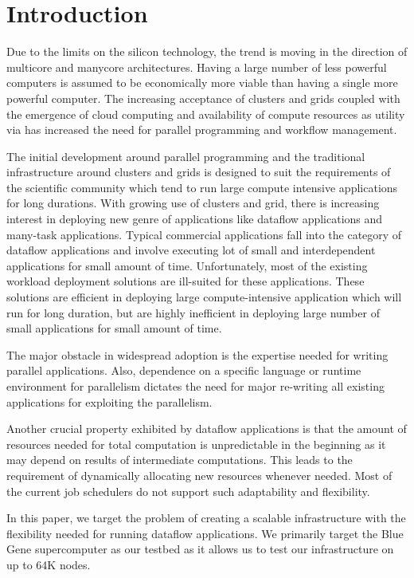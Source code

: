 \documentclass[conference]{sig-alternate}
\begin{document}
\IEEEpeerreviewmaketitle

\section{Introduction}

Due to the limits on the silicon technology, the trend is moving in the
direction of multicore and manycore architectures.  Having a large number of
less powerful computers is assumed to be economically more viable than having a
single more powerful computer.  The increasing acceptance of clusters and
grids coupled with the emergence of cloud computing and availability of compute
resources as utility via \cite{ec2} \cite{azure} \cite{appengine} has increased
the need for parallel programming and workflow management.

The initial development around parallel programming and the traditional
infrastructure around clusters and grids is designed to suit the
requirements of the scientific community which tend to run large compute
intensive applications for long durations.  With growing use of clusters and
grid, there is increasing interest in deploying new genre of applications like
dataflow applications and many-task applications. Typical commercial
applications fall into the category of dataflow applications and involve
executing lot of small and interdependent applications for small amount of time.
Unfortunately, most of the existing workload deployment solutions are ill-suited
for these applications. These solutions are efficient in deploying large
compute-intensive application which will run for long duration, but are highly
inefficient in deploying large number of small applications for small amount of
time.

The major obstacle in widespread adoption is the expertise needed for writing
parallel applications.  Also, dependence on a specific language or runtime
environment for parallelism dictates the need for major re-writing all existing
applications for exploiting the parallelism.


Another crucial property exhibited by dataflow applications is that the amount
of resources needed for total computation is unpredictable in the beginning as
it may depend on results of intermediate computations.  This leads to the
requirement of dynamically allocating new resources whenever needed. Most of the
current job schedulers do not support such adaptability and flexibility.


In this paper, we target the problem of creating a scalable infrastructure
with the flexibility needed for running dataflow applications.  We primarily
target the Blue Gene \cite{bgp} supercomputer as our testbed as it allows us to
test our infrastructure on up to 64K nodes.
\end{document}
